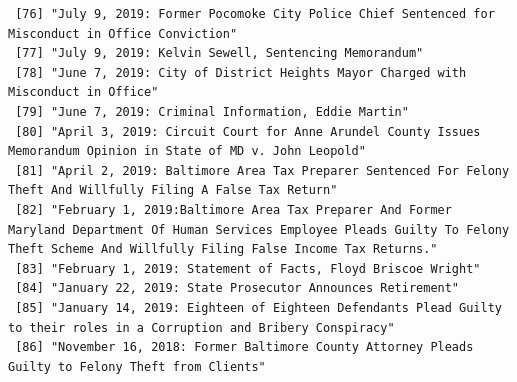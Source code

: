 \documentclass[
  letterpaper,
  DIV=11,
  numbers=noendperiod]{scrreprt}
\begin{document}
\begin{verbatim}
 [76] "July 9, 2019: Former Pocomoke City Police Chief Sentenced for Misconduct in Office Conviction"                                                                                                                                                       
 [77] "July 9, 2019: Kelvin Sewell, Sentencing Memorandum"                                                                                                                                                                                                  
 [78] "June 7, 2019: City of District Heights Mayor Charged with Misconduct in Office"                                                                                                                                                                      
 [79] "June 7, 2019: Criminal Information, Eddie Martin"                                                                                                                                                                                                    
 [80] "April 3, 2019: Circuit Court for Anne Arundel County Issues Memorandum Opinion in State of MD v. John Leopold"                                                                                                                                       
 [81] "April 2, 2019: Baltimore Area Tax Preparer Sentenced For Felony Theft And Willfully Filing A False Tax Return"                                                                                                                                       
 [82] "February 1, 2019:Baltimore Area Tax Preparer And Former Maryland Department Of Human Services Employee Pleads Guilty To Felony Theft Scheme And Willfully Filing False Income Tax Returns."                                                          
 [83] "February 1, 2019: Statement of Facts, Floyd Briscoe Wright"                                                                                                                                                                                          
 [84] "January 22, 2019: State Prosecutor Announces Retirement"                                                                                                                                                                                             
 [85] "January 14, 2019: Eighteen of Eighteen Defendants Plead Guilty to their roles in a Corruption and Bribery Conspiracy"                                                                                                                                
 [86] "November 16, 2018: Former Baltimore County Attorney Pleads Guilty to Felony Theft from Clients"                                                                                                                                                      

\end{verbatim}
\end{document}
